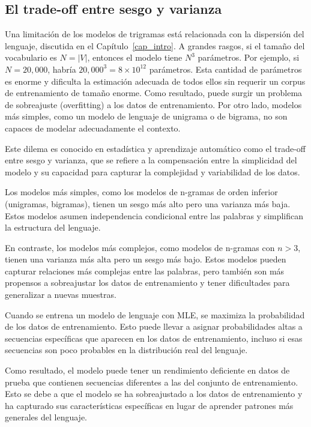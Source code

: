 \subsection{El trade-off entre sesgo y varianza}

Una limitación de los modelos de trigramas está relacionada con la dispersión del lenguaje, discutida en el Capítulo~\ref{cap_intro}. A grandes rasgos, si el tamaño del vocabulario es $N = |V|$, entonces el modelo tiene $N^3$ parámetros. Por ejemplo, si $N = 20,000$, habría $20,000^3 = 8 \times 10^{12}$ parámetros. Esta cantidad de parámetros es enorme y dificulta la estimación adecuada de todos ellos sin requerir un corpus de entrenamiento de tamaño enorme. Como resultado, puede surgir un problema de sobreajuste (overfitting) a los datos de entrenamiento. Por otro lado, modelos más simples, como un modelo de lenguaje de unigrama o de bigrama, no son capaces de modelar adecuadamente el contexto.

Este dilema es conocido en estadística y aprendizaje automático como el trade-off entre sesgo y varianza, que se refiere a la compensación entre la simplicidad del modelo y su capacidad para capturar la complejidad y variabilidad de los datos.

Los modelos más simples, como los modelos de n-gramas de orden inferior (unigramas, bigramas), tienen un sesgo más alto pero una varianza más baja. Estos modelos asumen independencia condicional entre las palabras y simplifican la estructura del lenguaje.

En contraste, los modelos más complejos, como modelos de n-gramas con $n>3$, tienen una varianza más alta pero un sesgo más bajo. Estos modelos pueden capturar relaciones más complejas entre las palabras, pero también son más propensos a sobreajustar los datos de entrenamiento y tener dificultades para generalizar a nuevas muestras.

Cuando se entrena un modelo de lenguaje con MLE, se maximiza la probabilidad de los datos de entrenamiento. Esto puede llevar a asignar probabilidades altas a secuencias específicas que aparecen en los datos de entrenamiento, incluso si esas secuencias son poco probables en la distribución real del lenguaje.

Como resultado, el modelo puede tener un rendimiento deficiente en datos de prueba que contienen secuencias diferentes a las del conjunto de entrenamiento. Esto se debe a que el modelo se ha sobreajustado a los datos de entrenamiento y ha capturado sus características específicas en lugar de aprender patrones más generales del lenguaje.

